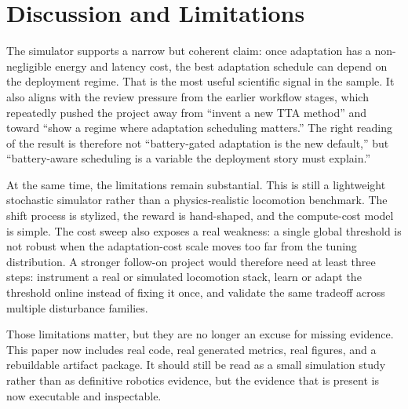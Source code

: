 \section{Discussion and Limitations}

The simulator supports a narrow but coherent claim: once adaptation has a non-negligible energy and latency cost, the best adaptation schedule can depend on the deployment regime. That is the most useful scientific signal in the sample. It also aligns with the review pressure from the earlier workflow stages, which repeatedly pushed the project away from ``invent a new TTA method'' and toward ``show a regime where adaptation scheduling matters.'' The right reading of the result is therefore not ``battery-gated adaptation is the new default,'' but ``battery-aware scheduling is a variable the deployment story must explain.''

At the same time, the limitations remain substantial. This is still a lightweight stochastic simulator rather than a physics-realistic locomotion benchmark. The shift process is stylized, the reward is hand-shaped, and the compute-cost model is simple. The cost sweep also exposes a real weakness: a single global threshold is not robust when the adaptation-cost scale moves too far from the tuning distribution. A stronger follow-on project would therefore need at least three steps: instrument a real or simulated locomotion stack, learn or adapt the threshold online instead of fixing it once, and validate the same tradeoff across multiple disturbance families.

Those limitations matter, but they are no longer an excuse for missing evidence. This paper now includes real code, real generated metrics, real figures, and a rebuildable artifact package. It should still be read as a small simulation study rather than as definitive robotics evidence, but the evidence that is present is now executable and inspectable.
